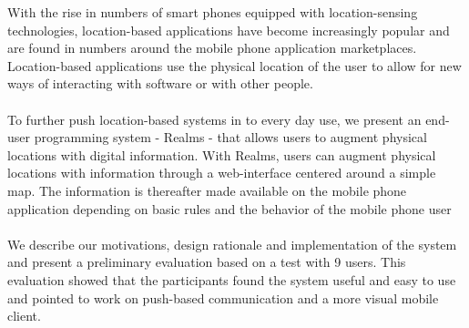With the rise in numbers of smart phones equipped with location-sensing technologies, location-based applications have become increasingly popular and are found in numbers around the mobile phone application marketplaces. Location-based applications use the physical location of the user to allow for new ways of interacting with software or with other people.
\\\\
To further push location-based systems in to every day use, we present an end-user programming system - Realms - that allows users to augment physical locations with digital information. With Realms, users can augment physical locations with information through a web-interface centered around a simple map. The information is thereafter made available on the mobile phone application depending on basic rules and the behavior of the mobile phone user
\\\\
We describe our motivations, design rationale and implementation of the system and present a preliminary evaluation based on a test with 9 users. This evaluation showed that the participants found the system useful and easy to use and pointed to work on push-based communication and a more visual mobile client.